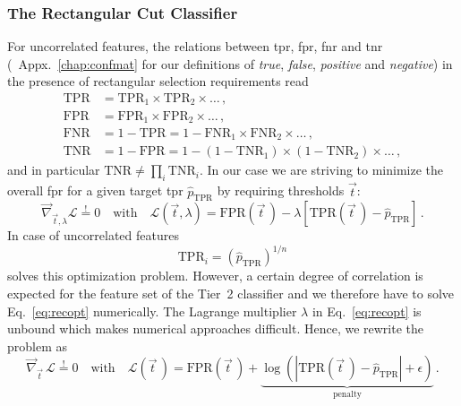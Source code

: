 \subsubsection{The Rectangular Cut Classifier}
For uncorrelated features, the relations between \gls{tpr}, \gls{fpr}, \gls{fnr} and \gls{tnr} (\cf{}~Appx.~\ref{chap:confmat} for our definitions of \textit{true}, \textit{false}, \textit{positive} and \textit{negative}) in the presence of rectangular selection requirements read
\begin{align*}
    \text{TPR} &= \text{TPR}_1 \times \text{TPR}_2 \times \ldots \,, \\
    \text{FPR} &= \text{FPR}_1 \times \text{FPR}_2 \times \ldots \,, \\
    \text{FNR} &= 1 - \text{TPR} = 1 - \text{FNR}_1 \times \text{FNR}_2 \times \ldots \,, \\
    \text{TNR} &= 1 - \text{FPR} = 1 - (1 - \text{TNR}_1) \times (1 - \text{TNR}_2) \times \ldots \,,
\end{align*}
and in particular $\text{TNR} \neq \prod_i \text{TNR}_i$.
In our case we are striving to minimize the overall \gls{fpr} for a given target \gls{tpr} $\hat p_\text{TPR}$ by requiring thresholds $\vec t$:
\begin{equation}
    \label{eq:recopt}
    \vec \nabla_{\vec t, \lambda} \mathcal{L} \overset{!}{=} 0 \quad \text{with} \quad \mathcal{L}\!\left(\vec{t}, \lambda \right) = \text{FPR}\!\left(\vec{t} \, \right) - \lambda \left[ \text{TPR}\!\left(\vec{t} \, \right) - \hat p_\text{TPR} \right] \,.
\end{equation}
In case of uncorrelated features
\begin{equation}
    \label{eq:recopt_init}
    \text{TPR}_i = (\hat p_\text{TPR})^{1/n}
\end{equation}
solves this optimization problem.
However, a certain degree of correlation is expected for the feature set of the Tier~2 classifier and we therefore have to solve Eq.~\eqref{eq:recopt} numerically.
The Lagrange multiplier $\lambda$ in Eq.~\eqref{eq:recopt} is unbound which makes numerical approaches difficult. Hence, we rewrite the problem as
\begin{equation}
    \label{eq:mva_siman}
    \vec \nabla_{\vec{t}} \, \mathcal{L} \overset{!}{=} 0 \quad \text{with} \quad \mathcal{L}\!\left(\vec{t} \, \right) = \text{FPR}\!\left(\vec{t} \, \right) + \underbrace{\log\!\left( \left| \text{TPR}\!\left(\vec{t} \, \right) - \hat p_\text{TPR} \right| + \epsilon \right)}_{\text{penalty}} \,.
\end{equation}
